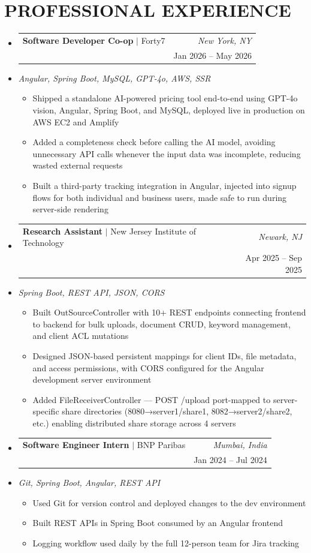 \documentclass[letterpaper,11pt]{article}
\makeatletter
\newcommand{\resumeItem}[1]{
  \item\small{#1\vspace{-3pt}}
}
\newcommand{\resumeStack}[1]{
  \vspace{1pt}\item\small{\textit{#1}}\vspace{-6pt}
}
\newcommand{\resumeExpHeading}[4]{
  \vspace{-3pt}\item
    \begin{tabular*}{1.0\textwidth}[t]{l@{\extracolsep{\fill}}r}
      \textbf{\large #1} $|$ #2 & \textit{\large #3} \\
       & {\small #4} \\
    \end{tabular*}\vspace{-9pt}
}
\newcommand{\resumeItemListStart}{\begin{itemize}[leftmargin=0.15in, label=$\bullet$]}
\newcommand{\resumeItemListEnd}{\end{itemize}\vspace{-7pt}}
\newcommand{\resumeSubHeadingListStart}{\begin{itemize}[leftmargin=0.0in, label={}]}
\newcommand{\resumeSubHeadingListEnd}{\end{itemize}}
\makeatother
\begin{document}
\section{PROFESSIONAL EXPERIENCE}
\resumeSubHeadingListStart
\vspace{10pt}
\resumeExpHeading
{Software Developer Co-op}{Forty7}{New York, NY}{Jan 2026 -- May 2026}
\vspace{-13pt}
\resumeStack{Angular, Spring Boot, MySQL, GPT-4o, AWS, SSR}
\resumeItemListStart
  \resumeItem{Shipped a standalone AI-powered pricing tool end-to-end using GPT-4o vision, Angular, Spring Boot, and MySQL, deployed live in production on AWS EC2 and Amplify}
  \resumeItem{Added a completeness check before calling the AI model, avoiding unnecessary API calls whenever the input data was incomplete, reducing wasted external requests}
  \resumeItem{Built a third-party tracking integration in Angular, injected into signup flows for both individual and business users, made safe to run during server-side rendering}
\resumeItemListEnd
\vspace{10pt}
\resumeExpHeading
{Research Assistant}{New Jersey Institute of Technology}{Newark, NJ}{Apr 2025 -- Sep 2025}
\vspace{-13pt}
\resumeStack{Spring Boot, REST API, JSON, CORS}
\resumeItemListStart
  \resumeItem{Built OutSourceController with 10+ REST endpoints connecting frontend to backend for bulk uploads, document CRUD, keyword management, and client ACL mutations}
  \resumeItem{Designed JSON-based persistent mappings for client IDs, file metadata, and access permissions, with CORS configured for the Angular development server environment}
  \resumeItem{Added FileReceiverController — POST /upload port-mapped to server-specific share directories (8080→server1/share1, 8082→server2/share2, etc.) enabling distributed share storage across 4 servers}
\resumeItemListEnd
\vspace{10pt}
\resumeExpHeading
{Software Engineer Intern}{BNP Paribas}{Mumbai, India}{Jan 2024 -- Jul 2024}
\vspace{-13pt}
\resumeStack{Git, Spring Boot, Angular, REST API}
\resumeItemListStart
  \resumeItem{Used Git for version control and deployed changes to the dev environment}
  \resumeItem{Built REST APIs in Spring Boot consumed by an Angular frontend}
  \resumeItem{Logging workflow used daily by the full 12-person team for Jira tracking}
\resumeItemListEnd

\resumeSubHeadingListEnd

\vspace{-3pt}
\end{document}
